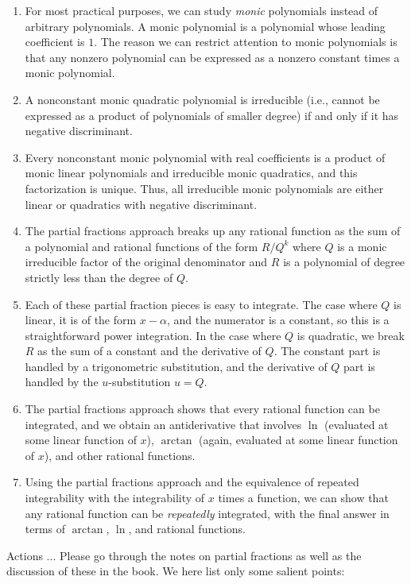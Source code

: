 \documentclass[10pt]{amsart}
\begin{document}
\begin{enumerate}
\item For most practical purposes, we can study {\em monic}
  polynomials instead of arbitrary polynomials. A monic polynomial is
  a polynomial whose leading coefficient is $1$. The reason we can
  restrict attention to monic polynomials is that any nonzero
  polynomial can be expressed as a nonzero constant times a monic
  polynomial.
\item A nonconstant monic quadratic polynomial is irreducible (i.e.,
  cannot be expressed as a product of polynomials of smaller degree)
  if and only if it has negative discriminant.
\item Every nonconstant monic polynomial with real coefficients is a
  product of monic linear polynomials and irreducible monic
  quadratics, and this factorization is unique. Thus, all irreducible
  monic polynomials are either linear or quadratics with negative
  discriminant.
\item The partial fractions approach breaks up any rational function
  as the sum of a polynomial and rational functions of the form
  $R/Q^k$ where $Q$ is a monic irreducible factor of the original
  denominator and $R$ is a polynomial of degree strictly less than the
  degree of $Q$.
\item Each of these partial fraction pieces is easy to integrate. The
  case where $Q$ is linear, it is of the form $x - \alpha$, and the
  numerator is a constant, so this is a straightforward power
  integration. In the case where $Q$ is quadratic, we break $R$ as the
  sum of a constant and the derivative of $Q$. The constant part is
  handled by a trigonometric substitution, and the derivative of $Q$
  part is handled by the $u$-substitution $u = Q$.
\item The partial fractions approach shows that every rational
  function can be integrated, and we obtain an antiderivative that
  involves $\ln$ (evaluated at some linear function of $x$), $\arctan$
  (again, evaluated at some linear function of $x$), and other rational
  functions.
\item Using the partial fractions approach and the equivalence of
  repeated integrability with the integrability of $x$ times a
  function, we can show that any rational function can be {\em
  repeatedly} integrated, with the final answer in terms of $\arctan$,
  $\ln$, and rational functions.
\end{enumerate}

Actions ... Please go through the notes on partial fractions as well
as the discussion of these in the book. We here list only some salient
points:
\end{document}
